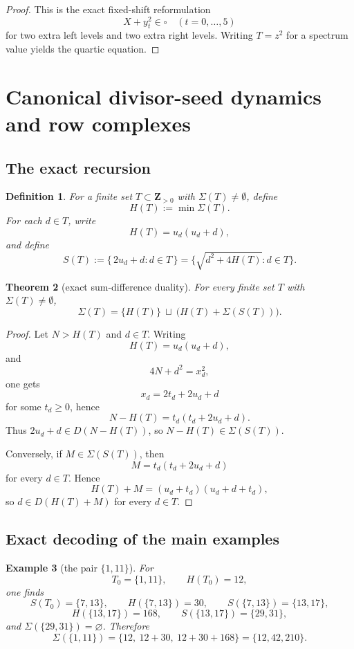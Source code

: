 \documentclass[11pt]{article}
\theoremstyle{plainbreak}
\newtheorem{theorem}{Theorem}[section]
\theoremstyle{defbreak}
\newtheorem{definition}[theorem]{Definition}
\newtheorem{example}[theorem]{Example}
\newcommand{\Dset}{D}
\newcommand{\Z}{\mathbf{Z}}
\begin{document}
\begin{proof}
This is the exact fixed-shift reformulation
\[
X+y_t^2\in \square \quad (t=0,\dots,5)
\]
for two extra left levels and two extra right levels.  Writing $T=z^2$ for a spectrum value yields the quartic equation.
\end{proof}

\section{Canonical divisor-seed dynamics and row complexes}

\subsection{The exact recursion}

\begin{definition}
For a finite set $T\subset \Z_{>0}$ with $\Sigma(T)\neq\emptyset$, define
\[
H(T):=\min \Sigma(T).
\]
For each $d\in T$, write
\[
H(T)=u_d(u_d+d),
\]
and define
\[
S(T):=\{\,2u_d+d : d\in T\,\}
=
\{\sqrt{d^2+4H(T)}:d\in T\}.
\]
\end{definition}

\begin{theorem}[exact sum-difference duality]
For every finite set $T$ with $\Sigma(T)\neq\emptyset$,
\[
\Sigma(T)=\{H(T)\}\ \sqcup\ \bigl(H(T)+\Sigma(S(T))\bigr).
\]
\end{theorem}

\begin{proof}
Let $N>H(T)$ and $d\in T$. Writing
\[
H(T)=u_d(u_d+d),
\]
and
\[
4N+d^2=x_d^2,
\]
one gets
\[
x_d=2t_d+2u_d+d
\]
for some $t_d\ge 0$, hence
\[
N-H(T)=t_d(t_d+2u_d+d).
\]
Thus $2u_d+d\in \Dset(N-H(T))$, so $N-H(T)\in \Sigma(S(T))$.

Conversely, if $M\in \Sigma(S(T))$, then
\[
M=t_d(t_d+2u_d+d)
\]
for every $d\in T$. Hence
\[
H(T)+M=(u_d+t_d)(u_d+d+t_d),
\]
so $d\in \Dset(H(T)+M)$ for every $d\in T$.
\end{proof}

\subsection{Exact decoding of the main examples}

\begin{example}[the pair $\{1,11\}$]
For
\[
T_0=\{1,11\},
\qquad
H(T_0)=12,
\]
one finds
\[
S(T_0)=\{7,13\},\qquad H(\{7,13\})=30,\qquad S(\{7,13\})=\{13,17\},
\]
\[
H(\{13,17\})=168,\qquad S(\{13,17\})=\{29,31\},
\]
and $\Sigma(\{29,31\})=\varnothing$. Therefore
\[
\Sigma(\{1,11\})=\{12,\ 12+30,\ 12+30+168\}=\{12,42,210\}.
\]
\end{example}
\end{document}
